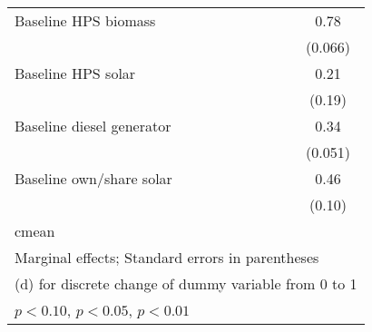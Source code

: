 \begin{table}[htbp]
\begin{tabular*}{1\hsize}{@{\hskip\tabcolsep\extracolsep\fill}l*{5}{c}}
Baseline HPS biomass&                  &                  &                  &                  &     0.78\sym{***}\\
                &                  &                  &                  &                  &  (0.066)         \\
Baseline HPS solar&                  &                  &                  &                  &     0.21         \\
                &                  &                  &                  &                  &   (0.19)         \\
Baseline diesel generator&                  &                  &                  &                  &     0.34\sym{***}\\
                &                  &                  &                  &                  &  (0.051)         \\
Baseline own/share solar&                  &                  &                  &                  &     0.46\sym{***}\\
                &                  &                  &                  &                  &   (0.10)         \\
\midrule
cmean           &                  &                  &                  &                  &                  \\
\bottomrule
\multicolumn{6}{l}{\footnotesize Marginal effects; Standard errors in parentheses}\\
\multicolumn{6}{l}{\footnotesize  (d) for discrete change of dummy variable from 0 to 1}\\
\multicolumn{6}{l}{\footnotesize \sym{*} \(p<0.10\), \sym{**} \(p<0.05\), \sym{***} \(p<0.01\)}\\
\end{tabular*}
\end{table}
